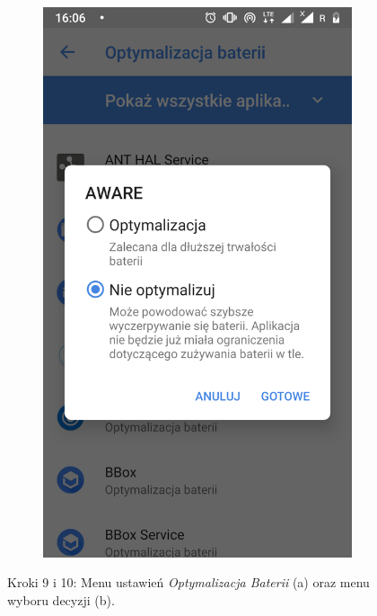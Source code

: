 \begin{enumerate}
\begin{figure}[H]
\begin{subfigure}{0.35\textwidth}
			\includegraphics[scale=0.13]{dodatekA/3_10.png}
			\subcaption{\label{subfigure_b}}
		\end{subfigure}
		\caption{ Kroki 9 i 10: Menu ustawień \textit{Optymalizacja Baterii} (a) oraz menu wyboru decyzji (b).}
	\end{figure}
	\clearpage 
	
\end{enumerate}


